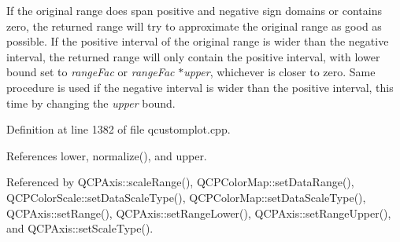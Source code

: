 If the original range does span positive and negative sign domains or contains zero, the returned range will try to approximate the original range as good as possible. If the positive interval of the original range is wider than the negative interval, the returned range will only contain the positive interval, with lower bound set to {\itshape range\+Fac} or {\itshape range\+Fac} $\ast${\itshape upper}, whichever is closer to zero. Same procedure is used if the negative interval is wider than the positive interval, this time by changing the {\itshape upper} bound. 

Definition at line 1382 of file qcustomplot.\+cpp.



References lower, normalize(), and upper.



Referenced by Q\+C\+P\+Axis\+::scale\+Range(), Q\+C\+P\+Color\+Map\+::set\+Data\+Range(), Q\+C\+P\+Color\+Scale\+::set\+Data\+Scale\+Type(), Q\+C\+P\+Color\+Map\+::set\+Data\+Scale\+Type(), Q\+C\+P\+Axis\+::set\+Range(), Q\+C\+P\+Axis\+::set\+Range\+Lower(), Q\+C\+P\+Axis\+::set\+Range\+Upper(), and Q\+C\+P\+Axis\+::set\+Scale\+Type().


